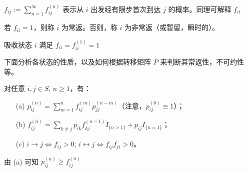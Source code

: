 \documentclass[lang=cn,10pt,thmcnt=section]{elegantbook}
\begin{document}
	$f_{ij} := \sum_{n=1}^{\infty} f_{ij}^{(n)}$ 表示从 $i$ 出发经有限步首次到达 $j$ 的概率。同理可解释 $f_{ii}$

\begin{definition}[常返状态]
	若 $f_{ii} = 1$，则称 $i$ 为常返。否则，称 $i$ 为非常返（或暂留，瞬时的）。

\end{definition}
\begin{remark}

	吸收状态 $i$ 满足 $f_{ii} = f_{ii}^{(1)} = 1$
\end{remark}

下面分析各状态的性质，以及如何根据转移矩阵 $P$ 来判断其常返性，不可约性等。
\begin{theorem}
	对任意 $i, j \in S$, $n \geq 1$，有：
\begin{enumerate}\label{4.4}
    \item[(a)] $p_{ij}^{(n)} = \sum_{m=1}^{n} f_{ij}^{(m)} p_{jj}^{(n-m)}$（注意，$p_{ij}^{(0)} \equiv 1$）；
    \item[(b)] $f_{ij}^{(n)} = \sum_{k \neq j} p_{ik} f_{kj}^{(n-1)} I_{\{n > 1\}} + p_{ij} I_{\{n=1\}}$；
    \item[(c)] $i \rightarrow j \Longleftrightarrow f_{ij} > 0$; $i \leftrightarrow j \Longleftrightarrow f_{ij} f_{ji} > 0$。
\end{enumerate}

\end{theorem}
\begin{remark}
	由 (a) 可知 $p_{ij}^{(n)} \geq f_{ij}^{(n)}$
\end{remark}
\end{document}
